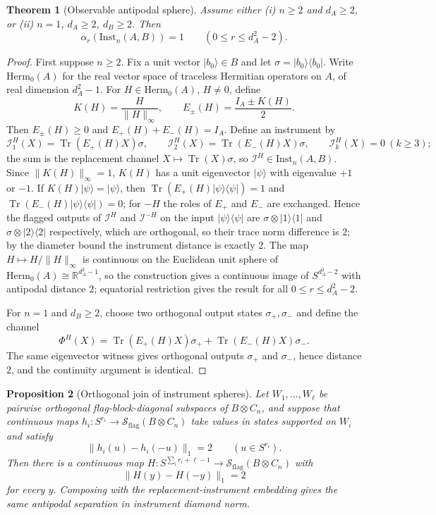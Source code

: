\documentclass[11pt,a4paper]{article}
\newtheorem{theorem}{Theorem}[section]
\newtheorem{proposition}[theorem]{Proposition}
\newcommand{\Herm}{\mathrm{Herm}}
\newcommand{\Sstate}{\mathcal{S}}
\newcommand{\Inst}{\mathrm{Inst}}
\newcommand{\Tr}{\operatorname{Tr}}
\begin{document}
\begin{theorem}[Observable antipodal sphere]
\label{thm:observable}
Assume either (i) $n\ge2$ and $d_A\ge2$, or (ii) $n=1$, $d_A\ge2$, $d_B\ge2$. Then
\[
\alpha_r(\Inst_n(A,B))=1\qquad(0\le r\le d_A^2-2).
\]
\end{theorem}

\begin{proof}
First suppose $n\ge2$. Fix a unit vector $|b_0\rangle\in B$ and let $\sigma=|b_0\rangle\langle b_0|$. Write $\Herm_0(A)$ for the real vector space of traceless Hermitian operators on $A$, of real dimension $d_A^2-1$. For $H\in\Herm_0(A)$, $H\neq0$, define
\[
K(H)=\frac{H}{\|H\|_\infty},\qquad E_\pm(H)=\frac{I_A\pm K(H)}2.
\]
Then $E_\pm(H)\ge0$ and $E_+(H)+E_-(H)=I_A$. Define an instrument by
\[
\mathcal I^H_1(X)=\Tr(E_+(H)X)\sigma,\qquad
\mathcal I^H_2(X)=\Tr(E_-(H)X)\sigma,\qquad
\mathcal I^H_k(X)=0\ (k\ge3);
\]
the sum is the replacement channel $X\mapsto\Tr(X)\sigma$, so $\mathcal I^H\in\Inst_n(A,B)$. Since $\|K(H)\|_\infty=1$, $K(H)$ has a unit eigenvector $|\psi\rangle$ with eigenvalue $+1$ or $-1$. If $K(H)|\psi\rangle=|\psi\rangle$, then $\Tr(E_+(H)|\psi\rangle\langle\psi|)=1$ and $\Tr(E_-(H)|\psi\rangle\langle\psi|)=0$; for $-H$ the roles of $E_+$ and $E_-$ are exchanged. Hence the flagged outputs of $\mathcal I^H$ and $\mathcal I^{-H}$ on the input $|\psi\rangle\langle\psi|$ are $\sigma\otimes|1\rangle\langle1|$ and $\sigma\otimes|2\rangle\langle2|$ respectively, which are orthogonal, so their trace norm difference is $2$; by the diameter bound the instrument distance is exactly $2$. The map $H\mapsto H/\|H\|_\infty$ is continuous on the Euclidean unit sphere of $\Herm_0(A)\cong\mathbb R^{d_A^2-1}$, so the construction gives a continuous image of $S^{d_A^2-2}$ with antipodal distance $2$; equatorial restriction gives the result for all $0\le r\le d_A^2-2$.

For $n=1$ and $d_B\ge2$, choose two orthogonal output states $\sigma_+,\sigma_-$ and define the channel
\[
\Phi^H(X)=\Tr(E_+(H)X)\sigma_++\Tr(E_-(H)X)\sigma_-.
\]
The same eigenvector witness gives orthogonal outputs $\sigma_+$ and $\sigma_-$, hence distance $2$, and the continuity argument is identical.
\end{proof}

\begin{proposition}[Orthogonal join of instrument spheres]
\label{prop:join}
Let $W_1,\dots,W_\ell$ be pairwise orthogonal flag-block-diagonal subspaces of $B\otimes C_n$, and suppose that continuous maps $h_i:S^{r_i}\to\Sstate_{\mathrm{flag}}(B\otimes C_n)$ take values in states supported on $W_i$ and satisfy
\[
\|h_i(u)-h_i(-u)\|_1=2\qquad(u\in S^{r_i}).
\]
Then there is a continuous map $H:S^{\sum_i r_i+\ell-1}\to\Sstate_{\mathrm{flag}}(B\otimes C_n)$ with
\[
\|H(y)-H(-y)\|_1=2
\]
for every $y$. Composing with the replacement-instrument embedding gives the same antipodal separation in instrument diamond norm.
\end{proposition}
\end{document}
